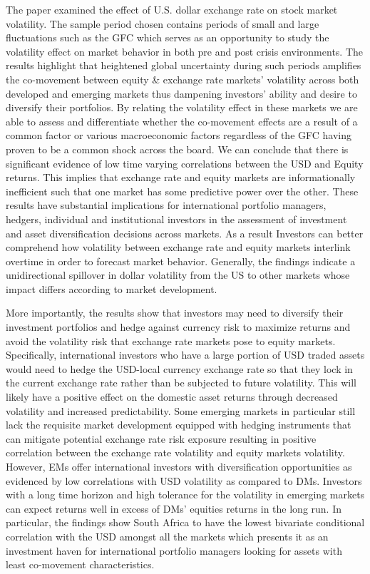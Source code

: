 \documentclass[11pt,preprint, authoryear]{elsarticle}
\numberwithin{equation}{section}
\numberwithin{figure}{section}
\numberwithin{table}{section}
\begin{document}
The paper examined the effect of U.S. dollar exchange rate on stock
market volatility. The sample period chosen contains periods of small
and large fluctuations such as the GFC which serves as an opportunity to
study the volatility effect on market behavior in both pre and post
crisis environments. The results highlight that heightened global
uncertainty during such periods amplifies the co-movement between equity
\& exchange rate markets' volatility across both developed and emerging
markets thus dampening investors' ability and desire to diversify their
portfolios. By relating the volatility effect in these markets we are
able to assess and differentiate whether the co-movement effects are a
result of a common factor or various macroeconomic factors regardless of
the GFC having proven to be a common shock across the board. We can
conclude that there is significant evidence of low time varying
correlations between the USD and Equity returns. This implies that
exchange rate and equity markets are informationally inefficient such
that one market has some predictive power over the other. These results
have substantial implications for international portfolio managers,
hedgers, individual and institutional investors in the assessment of
investment and asset diversification decisions across markets. As a
result Investors can better comprehend how volatility between exchange
rate and equity markets interlink overtime in order to forecast market
behavior. Generally, the findings indicate a unidirectional spillover in
dollar volatility from the US to other markets whose impact differs
according to market development.

More importantly, the results show that investors may need to diversify
their investment portfolios and hedge against currency risk to maximize
returns and avoid the volatility risk that exchange rate markets pose to
equity markets. Specifically, international investors who have a large
portion of USD traded assets would need to hedge the USD-local currency
exchange rate so that they lock in the current exchange rate rather than
be subjected to future volatility. This will likely have a positive
effect on the domestic asset returns through decreased volatility and
increased predictability. Some emerging markets in particular still lack
the requisite market development equipped with hedging instruments that
can mitigate potential exchange rate risk exposure resulting in positive
correlation between the exchange rate volatility and equity markets
volatility. However, EMs offer international investors with
diversification opportunities as evidenced by low correlations with USD
volatility as compared to DMs. Investors with a long time horizon and
high tolerance for the volatility in emerging markets can expect returns
well in excess of DMs' equities returns in the long run. In particular,
the findings show South Africa to have the lowest bivariate conditional
correlation with the USD amongst all the markets which presents it as an
investment haven for international portfolio managers looking for assets
with least co-movement characteristics.
\end{document}
